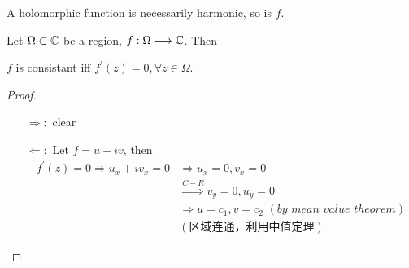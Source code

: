 	\vspace{2em}
	A holomorphic function is necessarily harmonic, so is $\overline{f}$.
	\begin{proposition}\label{prop 2.5.3}
		Let $\Omega \subset \mathbb{C}$ be a region, $f : \Omega \longrightarrow \mathbb{C}$. Then
		\begin{center}
			$f$ is consistant iff $f^{'}(z) = 0 , \forall z \in \Omega$.
		\end{center}
		
		\vspace{2em}
		\begin{proof}
			\begin{enumerate}
				\item[$\Rightarrow:$]clear
				
				\item[$\Leftarrow:$]Let $f = u + i v$, then
				\begin{align}
					f^{'}(z) = 0 \Rightarrow u_x + i v_x = 0 &\Rightarrow u_x = 0 , v_x = 0 \\
					&\overset{C-R}{\Rightarrow} v_y = 0 , u_y = 0 \\
					&\Rightarrow u = c_1 , v = c_2 \,\, (by \,\, mean \,\, value \,\, theorem) \\
					&(\text{区域连通，利用中值定理})
				\end{align}
			\end{enumerate}
		\end{proof}
	\end{proposition}

\newpage
